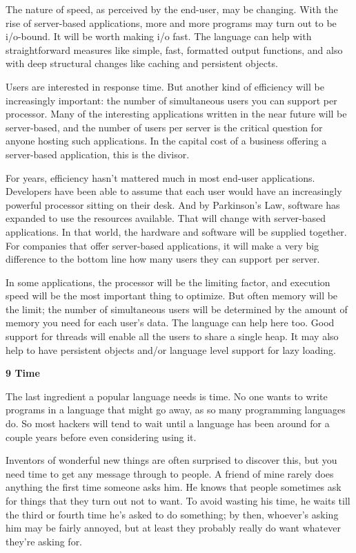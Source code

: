 The nature of speed, as perceived by the end-user, may be changing. With
the rise of server-based applications, more and more programs may turn
out to be i/o-bound. It will be worth making i/o fast. The language can
help with straightforward measures like simple, fast, formatted output
functions, and also with deep structural changes like caching and
persistent objects.

Users are interested in response time. But another kind of efficiency
will be increasingly important: the number of simultaneous users you can
support per processor. Many of the interesting applications written in
the near future will be server-based, and the number of users per server
is the critical question for anyone hosting such applications. In the
capital cost of a business offering a server-based application, this is
the divisor.

For years, efficiency hasn't mattered much in most end-user
applications. Developers have been able to assume that each user would
have an increasingly powerful processor sitting on their desk. And by
Parkinson's Law, software has expanded to use the resources available.
That will change with server-based applications. In that world, the
hardware and software will be supplied together. For companies that
offer server-based applications, it will make a very big difference to
the bottom line how many users they can support per server.

In some applications, the processor will be the limiting factor, and
execution speed will be the most important thing to optimize. But often
memory will be the limit; the number of simultaneous users will be
determined by the amount of memory you need for each user's data. The
language can help here too. Good support for threads will enable all the
users to share a single heap. It may also help to have persistent
objects and/or language level support for lazy loading.

\textbf{9 Time}

The last ingredient a popular language needs is time. No one wants to
write programs in a language that might go away, as so many programming
languages do. So most hackers will tend to wait until a language has
been around for a couple years before even considering using it.

Inventors of wonderful new things are often surprised to discover this,
but you need time to get any message through to people. A friend of mine
rarely does anything the first time someone asks him. He knows that
people sometimes ask for things that they turn out not to want. To avoid
wasting his time, he waits till the third or fourth time he's asked to
do something; by then, whoever's asking him may be fairly annoyed, but
at least they probably really do want whatever they're asking for.

